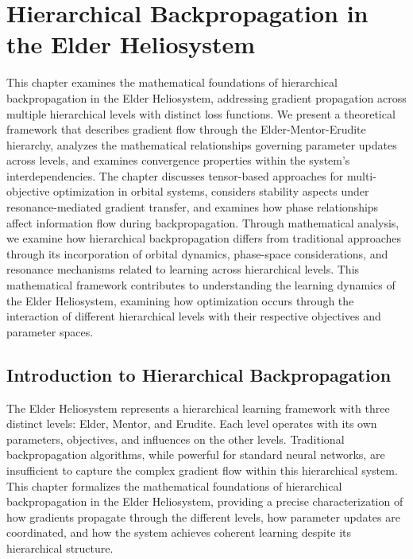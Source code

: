 \chapter{Hierarchical Backpropagation in the Elder Heliosystem}

\begin{tcolorbox}[colback=DarkSkyBlue!5!white,colframe=DarkSkyBlue!75!black,title=Chapter Summary]
This chapter examines the mathematical foundations of hierarchical backpropagation in the Elder Heliosystem, addressing gradient propagation across multiple hierarchical levels with distinct loss functions. We present a theoretical framework that describes gradient flow through the Elder-Mentor-Erudite hierarchy, analyzes the mathematical relationships governing parameter updates across levels, and examines convergence properties within the system's interdependencies. The chapter discusses tensor-based approaches for multi-objective optimization in orbital systems, considers stability aspects under resonance-mediated gradient transfer, and examines how phase relationships affect information flow during backpropagation. Through mathematical analysis, we examine how hierarchical backpropagation differs from traditional approaches through its incorporation of orbital dynamics, phase-space considerations, and resonance mechanisms related to learning across hierarchical levels. This mathematical framework contributes to understanding the learning dynamics of the Elder Heliosystem, examining how optimization occurs through the interaction of different hierarchical levels with their respective objectives and parameter spaces.
\end{tcolorbox}

\section{Introduction to Hierarchical Backpropagation}

The Elder Heliosystem represents a hierarchical learning framework with three distinct levels: Elder, Mentor, and Erudite. Each level operates with its own parameters, objectives, and influences on the other levels. Traditional backpropagation algorithms, while powerful for standard neural networks, are insufficient to capture the complex gradient flow within this hierarchical system. This chapter formalizes the mathematical foundations of hierarchical backpropagation in the Elder Heliosystem, providing a precise characterization of how gradients propagate through the different levels, how parameter updates are coordinated, and how the system achieves coherent learning despite its hierarchical structure.

